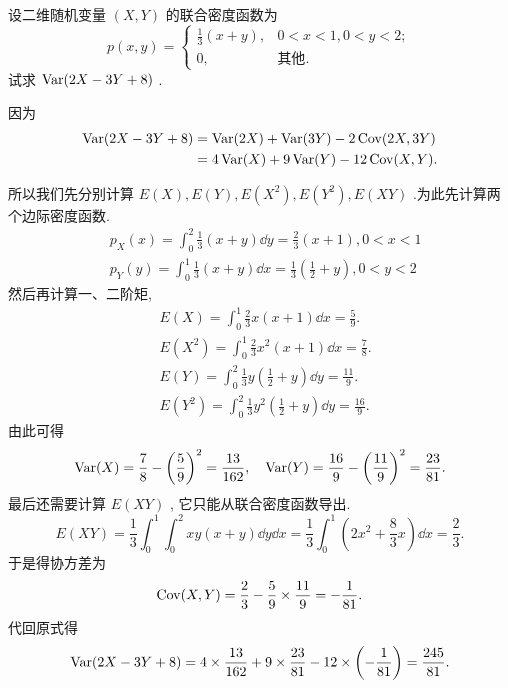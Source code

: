 	\begin{example}\label{exam:3.4.8}
		设二维随机变量 $(X,Y)$ 的联合密度函数为
		\begin{equation*}
			p(x,y)=\begin{cases}
				\frac{1}{3}(x+y), & 0<x<1,0<y<2; \\
				0, & \text{其他}.
			\end{cases}
		\end{equation*}
		试求 $\operatorname{Var}(2 X-3 Y+8)$ .
		\begin{solution}
			因为
			\begin{align*}
				\operatorname{Var}(2X-3Y+8)&=\operatorname{Var}(2X)+\operatorname{Var}(3Y)-2\operatorname{Cov}(2X,3Y) \\
				&=4\operatorname{Var}(X)+9\operatorname{Var}(Y)-12\operatorname{Cov}(X,Y).
			\end{align*}
		\end{solution}
		所以我们先分别计算 $E(X),E(Y),E\left( X^2 \right),E\left( Y^2 \right),E(XY)$ .为此先计算两个边际密度函数.
		\begin{align*}
			&p_{X}(x)=\int_{0}^{2} \frac{1}{3}(x+y) \dd y=\frac{2}{3}(x+1),  0<x<1\\
			&p_{Y}(y)=\int_{0}^{1} \frac{1}{3}(x+y) \dd x=\frac{1}{3}\left(\frac{1}{2}+y\right), 0<y<2
		\end{align*}
		然后再计算一、二阶矩,
		\begin{align*}
			&E(X)=\int_{0}^{1} \frac{2}{3} x(x+1) \dd x=\frac{5}{9}.\\
			&E\left( X^2 \right)=\int_{0}^{1} \frac{2}{3} x^{2}(x+1) \dd x=\frac{7}{8}.\\
			&E(Y)=\int_{0}^{2} \frac{1}{3} y\left(\frac{1}{2}+y\right) \dd y=\frac{11}{9}.\\
			&E\left( Y^2 \right)=\int_{0}^{2} \frac{1}{3} y^{2}\left(\frac{1}{2}+y\right) \dd y=\frac{16}{9}.
		\end{align*}
		由此可得
		\begin{equation*}
			\operatorname{Var}(X)=\frac{7}{8}-\left(\frac{5}{9}\right)^{2}=\frac{13}{162},\quad \operatorname{Var}(Y)=\frac{16}{9}-\left(\frac{11}{9}\right)^{2}=\frac{23}{81}.
		\end{equation*}
		最后还需要计算 $E(XY)$ , 它只能从联合密度函数导出.
		\begin{equation*}
			E(X Y)=\frac{1}{3} \int_{0}^{1} \int_{0}^{2} x y(x+y) \dd y \dd x=\frac{1}{3} \int_{0}^{1}\left(2 x^{2}+\frac{8}{3} x\right) \dd x=\frac{2}{3}.
		\end{equation*}
		于是得协方差为
		\begin{equation*}
			\operatorname{Cov}(X, Y)=\frac{2}{3}-\frac{5}{9} \times \frac{11}{9}=-\frac{1}{81}.
		\end{equation*}
		代回原式得
		\begin{equation*}
			\operatorname{Var}(2 X-3 Y+8)=4 \times \frac{13}{162}+9 \times \frac{23}{81}-12 \times\left(-\frac{1}{81}\right)=\frac{245}{81}.
		\end{equation*}
	\end{example}
